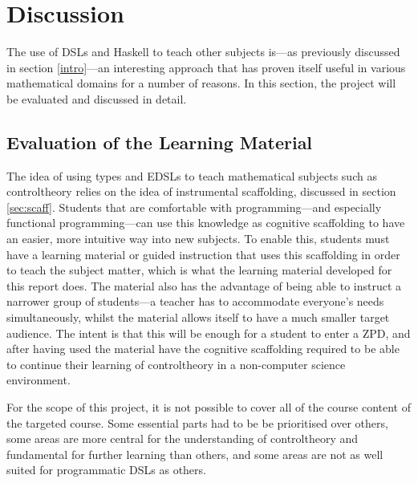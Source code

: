 \section{Discussion}\label{sec:discussion}



The use of \gls{DSL}s and \gls{Haskell} to teach other subjects is---as previously discussed in section \ref{intro}---an interesting approach that has proven itself useful in various mathematical domains for a number of reasons. %
In this section, the project will be evaluated and discussed in detail.



\subsection{Evaluation of the Learning Material}
The idea of using types and \gls{EDSL}s to teach mathematical subjects such as \gls{controltheory} relies on the idea of instrumental scaffolding, discussed in section \ref{sec:scaff}. Students that are comfortable with programming---and especially functional programming---can use this knowledge as cognitive scaffolding to have an easier, more intuitive way into new subjects. To enable this, students must have a learning material or guided instruction that uses this scaffolding in order to teach the subject matter, which is what the learning material developed for this report does. The material also has the advantage of being able to instruct a narrower group of students---a teacher has to accommodate everyone's needs simultaneously, whilst the material allows itself to have a much smaller target audience. 
The intent is that this will be enough for a student to enter a \gls{ZPD}, and after having used the material have the cognitive scaffolding required to be able to continue their learning of \gls{controltheory} in a non-computer science environment.


For the scope of this project, it is not possible to cover all of the course content of the targeted course. Some essential parts had to be be prioritised over others, some areas are more central for the understanding of \gls{controltheory} and fundamental for further learning than others, and some areas are not as well suited for programmatic \gls{DSL}s as others. 


